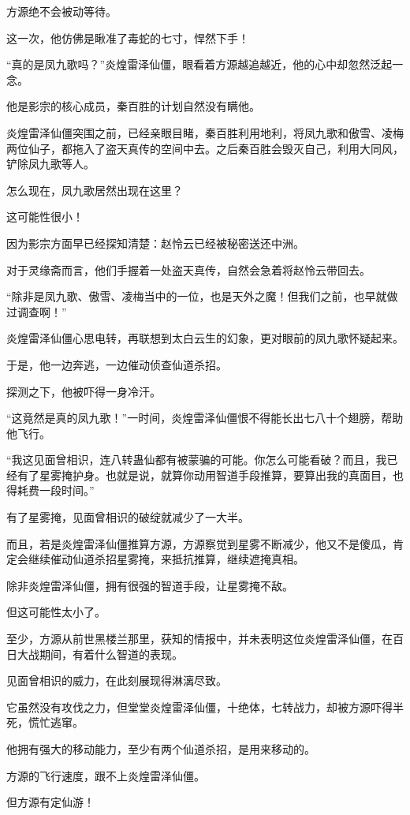 \begin{this_body}
方源绝不会被动等待。

这一次，他仿佛是瞅准了毒蛇的七寸，悍然下手！

“真的是凤九歌吗？”炎煌雷泽仙僵，眼看着方源越追越近，他的心中却忽然泛起一念。

他是影宗的核心成员，秦百胜的计划自然没有瞒他。

炎煌雷泽仙僵突围之前，已经亲眼目睹，秦百胜利用地利，将凤九歌和傲雪、凌梅两位仙子，都拖入了盗天真传的空间中去。之后秦百胜会毁灭自己，利用大同风，铲除凤九歌等人。

怎么现在，凤九歌居然出现在这里？

这可能性很小！

因为影宗方面早已经探知清楚：赵怜云已经被秘密送还中洲。

对于灵缘斋而言，他们手握着一处盗天真传，自然会急着将赵怜云带回去。

“除非是凤九歌、傲雪、凌梅当中的一位，也是天外之魔！但我们之前，也早就做过调查啊！”

炎煌雷泽仙僵心思电转，再联想到太白云生的幻象，更对眼前的凤九歌怀疑起来。

于是，他一边奔逃，一边催动侦查仙道杀招。

探测之下，他被吓得一身冷汗。

“这竟然是真的凤九歌！”一时间，炎煌雷泽仙僵恨不得能长出七八十个翅膀，帮助他飞行。

“我这见面曾相识，连八转蛊仙都有被蒙骗的可能。你怎么可能看破？而且，我已经有了星雾掩护身。也就是说，就算你动用智道手段推算，要算出我的真面目，也得耗费一段时间。”

有了星雾掩，见面曾相识的破绽就减少了一大半。

而且，若是炎煌雷泽仙僵推算方源，方源察觉到星雾不断减少，他又不是傻瓜，肯定会继续催动仙道杀招星雾掩，来抵抗推算，继续遮掩真相。

除非炎煌雷泽仙僵，拥有很强的智道手段，让星雾掩不敌。

但这可能性太小了。

至少，方源从前世黑楼兰那里，获知的情报中，并未表明这位炎煌雷泽仙僵，在百日大战期间，有着什么智道的表现。

见面曾相识的威力，在此刻展现得淋漓尽致。

它虽然没有攻伐之力，但堂堂炎煌雷泽仙僵，十绝体，七转战力，却被方源吓得半死，慌忙逃窜。

他拥有强大的移动能力，至少有两个仙道杀招，是用来移动的。

方源的飞行速度，跟不上炎煌雷泽仙僵。

但方源有定仙游！


\end{this_body}
